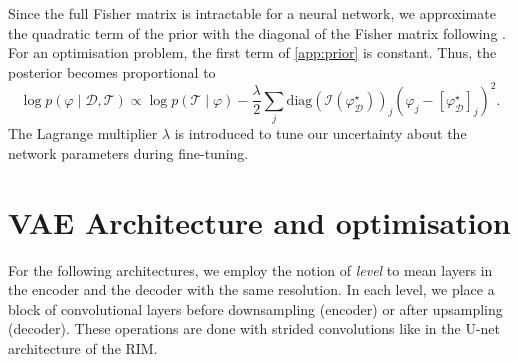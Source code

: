 Since the full Fisher matrix is intractable for a neural network, we approximate the 
quadratic term of the prior with the diagonal of the Fisher matrix following \citet{Kirkpatrick2016}. 
For an optimisation problem, the first term of \eqref{app:prior} is constant. Thus,
the posterior becomes proportional to
\begin{equation}
        \log p(\varphi \mid \mathcal{D}, \mathcal{T}) \propto 
        \log p(\mathcal{T} \mid \varphi ) - 
         \frac{\lambda}{2} 
        \sum_{j}\mathrm{diag}(\mathcal{I}(\varphi^{\star}_{\mathcal{D}}))_{j}(\varphi_j - [\varphi^{\star}_{\mathcal{D}}]_j)^2.
\end{equation} 
The Lagrange multiplier $\lambda$ is introduced to tune our uncertainty about the network parameters 
during fine-tuning.

\chapter{VAE Architecture and optimisation}

For the following architectures, we employ the notion of \textit{level} 
to mean layers in the encoder and the decoder with the same resolution. 
In each level, we place a block of convolutional layers 
before downsampling (encoder) or after upsampling (decoder). These operations 
are done with strided convolutions like in the U-net architecture of the RIM.

